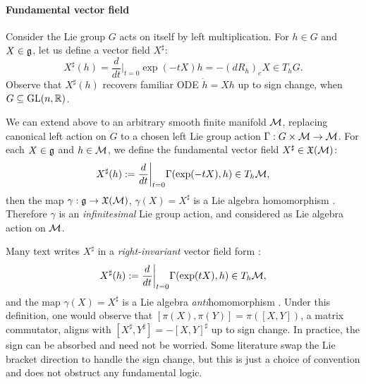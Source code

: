 \paragraph{Fundamental vector field}
Consider the Lie group $G$ acts on itself by left multiplication.
For $h \in G$ and $X \in \mathfrak{g}$, let us define a vector field $X^\sharp$:
\begin{equation*}
    X^\sharp(h) = \frac{d}{dt} \bigg \vert_{t=0} \exp(-tX)h = -(dR_h)_eX \in T_hG.
\end{equation*}
Observe that $X^\sharp(h)$ recovers familiar ODE $\dot{h} = Xh$
up to sign change, when $G \subseteq \text{GL}(n,\mathbb{R})$.

We can extend above to an arbitrary smooth finite manifold $\mathcal{M}$,
replacing canonical left action on $G$ to a chosen left Lie group action $\Gamma: G \times \mathcal{M} \to \mathcal{M}$.
For each $X \in \mathfrak{g}$ and $h \in \mathcal{M}$, we define the fundamental vector field $X^\sharp \in \mathfrak{X}(\mathcal{M})$:
\begin{equation}
\label{app:eq_fundamental_vector_field}
    X^\sharp (h) := \frac{d}{dt}\bigg\vert_{t=0}\Gamma(\exp(-tX), h) \in T_h\mathcal{M},
\end{equation}
then the map $\gamma: \mathfrak{g} \to \mathfrak{X}(\mathcal{M})$,
$\gamma(X)= X^\sharp$ is a Lie algebra homomorphism \cite{iserles2000lie, robbin2022introduction}.
Therefore $\gamma$ is an \emph{infinitesimal} Lie group action, and considered as Lie algebra action on $\mathcal{M}$.
\begin{remark}
\label{app:rem_Bracket_Sign}
Many text writes $X^\sharp$ in a \emph{right-invariant} vector field form \cite{robbin2022introduction}:
\begin{equation}
\label{app:eq_fundamental_vector_field2}
    X^\sharp (h) := \frac{d}{dt}\bigg\vert_{t=0}\Gamma(\exp(tX), h) \in T_h\mathcal{M},
\end{equation}
and the map $\gamma(X)= X^\sharp$ is a Lie algebra \emph{anti}homomorphism \cite{iserles2000lie, robbin2022introduction}.
Under this definition, one would observe that $[\pi(X), \pi(Y)] = \pi([X,Y])$, a matrix commutator,
aligns with $[X^\sharp, Y^\sharp] = -[X,Y]^\sharp$ up to sign change.
In practice, the sign can be absorbed and need not be worried.
Some literature swap the Lie bracket direction to handle the sign change,
but this is just a choice of convention and does not obstruct any fundamental logic.
\end{remark}
